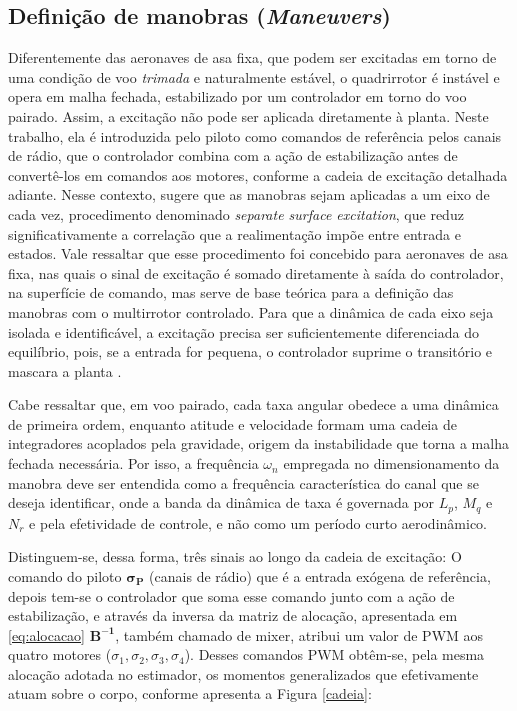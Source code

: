 \subsection{Definição de manobras (\textit{Maneuvers})}

Diferentemente das aeronaves de asa fixa, que podem ser excitadas em torno de uma condição de voo \textit{trimada} e naturalmente estável, o quadrirrotor é instável e opera em malha fechada, estabilizado por um controlador em torno do voo pairado. Assim, a excitação não pode ser aplicada diretamente à planta. Neste trabalho, ela é introduzida pelo piloto como comandos de referência pelos canais de rádio, que o controlador combina com a ação de estabilização antes de convertê-los em comandos aos motores, conforme a cadeia de excitação detalhada adiante. Nesse contexto, \textcite{Jategaonkar2015} sugere que as manobras sejam aplicadas a um eixo de cada vez, procedimento denominado \textit{separate surface excitation}, que reduz significativamente a correlação que a realimentação impõe entre entrada e estados. Vale ressaltar que esse procedimento foi concebido para aeronaves de asa fixa, nas quais o sinal de excitação é somado diretamente à saída do controlador, na superfície de comando, mas serve de base teórica para a definição das manobras com o multirrotor controlado. Para que a dinâmica de cada eixo seja isolada e identificável, a excitação precisa ser suficientemente diferenciada do equilíbrio, pois, se a entrada for pequena, o controlador suprime o transitório e mascara a planta \cite{Jategaonkar2015}.

Cabe ressaltar que, em voo pairado, cada taxa angular obedece a uma dinâmica de primeira ordem, enquanto atitude e velocidade formam uma cadeia de integradores acoplados pela gravidade, origem da instabilidade que torna a malha fechada necessária. Por isso, a frequência $\omega_n$ empregada no dimensionamento da manobra deve ser entendida como a frequência característica do canal que se deseja identificar, onde a banda da dinâmica de taxa é governada por $L_p$, $M_q$ e $N_r$ e pela efetividade de controle, e não como um período curto aerodinâmico.

Distinguem-se, dessa forma, três sinais ao longo da cadeia de excitação: O comando do piloto $\boldsymbol{\sigma_P}$ (canais de rádio) que é a entrada exógena de referência, depois tem-se o controlador que soma esse comando junto com a ação de estabilização, e através da inversa da matriz de alocação, apresentada em \eqref{eq:alocacao} $\mathbf{B^{-1}}$, também chamado de mixer, atribui um valor de PWM aos quatro motores ($\sigma_1, \sigma_2, \sigma_3, \sigma_4$). Desses comandos PWM obtêm-se, pela mesma alocação adotada no estimador, os momentos generalizados que efetivamente atuam sobre o corpo, conforme apresenta a Figura \ref{cadeia}:

